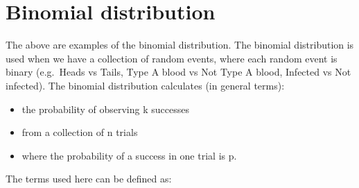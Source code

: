\documentclass[
  a4paper,
]{memoir}
\providecommand{\tightlist}{%
  \setlength{\itemsep}{0pt}\setlength{\parskip}{0pt}}
\begin{document}
\begin{table}[h]

\caption{\label{tbl-2-6}Probabilities of observing numbers of people
with Type A blood in a sample of three people}


\end{table}%

\section{Binomial distribution}\label{binomial-distribution}

The above are examples of the binomial distribution. The binomial
distribution is used when we have a collection of random events, where
each random event is binary (e.g.~Heads vs Tails, Type A blood vs Not
Type A blood, Infected vs Not infected). The binomial distribution
calculates (in general terms):

\begin{itemize}
\tightlist
\item
  the probability of observing k successes
\item
  from a collection of n trials
\item
  where the probability of a success in one trial is p.
\end{itemize}

The terms used here can be defined as:
\end{document}
